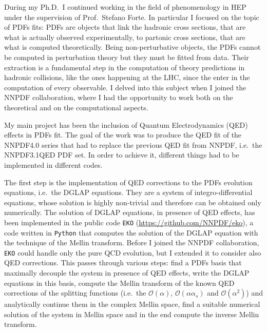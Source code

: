 \documentclass[11pt,a4paper]{moderncv}        %
\begin{document}
During my Ph.D.\ I continued working in the field of phenomenology in HEP under the supervision of Prof.\ Stefano Forte.
In particular I focused on the topic of PDFs fits: PDFs are objects that link the hadronic cross sections,
that are what is actually observed experimentally, to partonic cross sections, that are what is computed theoretically.
Being non-perturbative objects, the PDFs cannot be computed in perturbation theory but they must be fitted from data.
Their extraction is a fundamental step in the computation of theory predictions in hadronic collisions, like the ones happening 
at the LHC, since the enter in the computation of every observable.
I delved into this subject when I joined the NNPDF collaboration, where I had the opportunity to work both on the theoretical and on the
computational aspects.

My main project has been the inclusion of Quantum Electrodynamics (QED) effects in PDFs fit.
The goal of the work was to produce the QED fit of the NNPDF4.0 series that had to replace the previous QED fit from NNPDF, i.e.\ the NNPDF3.1QED PDF set.
In order to achieve it, different things had to be implemented in different codes.

The first step is the implementation of QED corrections to the PDFs evolution equations, i.e.\ the DGLAP equations.
They are a system of integro-differential equations, whose solution is highly non-trivial and therefore can be obtained only numerically.
The solution of DGLAP equations, in presence of QED effects, has been implemented in the public code \texttt{EKO}
(\url{https://github.com/NNPDF/eko}), a code written in \texttt{Python} that computes the solution of the DGLAP equation with the
technique of the Mellin transform.
Before I joined the NNPDF collaboration, \texttt{EKO} could handle only the pure QCD evolution, but I extended it to consider also QED corrections.
This passes through various steps: find a PDFs basis that maximally decouple the system in presence of QED effects, write the DGLAP equations in this basis,
compute the Mellin transform of the known QED corrections of the splitting functions
(i.e.\ the $\mathcal{O}(\alpha)$, $\mathcal{O}(\alpha \alpha_s)$ and $\mathcal{O}(\alpha^2)$) and analytically continue them in the complex Mellin space,
find a suitable numerical solution of the system in Mellin space and in the end compute the inverse Mellin transform.
\end{document}
